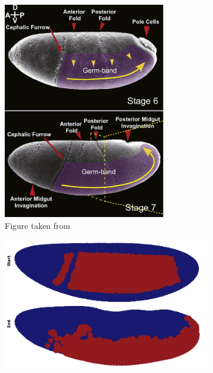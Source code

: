 \begin{figure}[H]
    \centering
    \begin{subfigure}[b]{0.34\textwidth}
        \includegraphics[width=\textwidth]{chapters/Results/figures/compareGB.png}
    \caption{Figure taken from \cite{kong2017forces} }
    \end{subfigure}
     \hfill
    \begin{subfigure}[b]{0.61\textwidth}
    \includegraphics[width=\textwidth]{chapters/Results/figures/gb_firstframe_lastframe.png}

\end{subfigure}
\end{figure}
